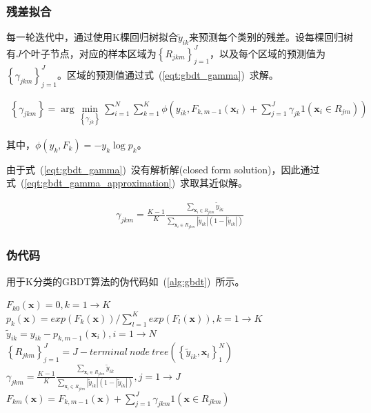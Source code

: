 \documentclass[a4paper,11pt,         %
               ]{article}
\begin{document}
\subsubsection{残差拟合}

每一轮迭代中，通过使用K棵回归树拟合$\tilde{y}_{ik}$来预测每个类别的残差。设每棵回归树有$J$个叶子节点，对应的样本区域为$\left \{ R_{jkm} \right \}_{j=1}^{J}$，以及每个区域的预测值为$\left \{ \gamma _{jkm} \right \}_{j=1}^{J}$。区域的预测值通过式~(\ref{eqt:gbdt_gamma})~求解。

\begin{eqnarray}
  \label{eqt:gbdt_gamma}
\left \{ \gamma _{jkm} \right \} = \arg \min_{\left \{ \gamma _{jk} \right \} } \sum _{i=1}^{N} \sum _{k=1}^{K}\phi \left ( y_{ik},F_{k,m-1}\left ( \mathbf{x}_{i} \right )+\sum _{j=1}^{J} \gamma _{jk}1\left ( \mathbf{x}_{i}\in R_{jm} \right )  \right )
\end{eqnarray}

其中，$\phi \left ( y_{k}, F_{k} \right ) = -y_{k} \log p_{k}$。

由于式~(\ref{eqt:gbdt_gamma})~没有解析解(closed form solution)，因此通过式~(\ref{eqt:gbdt_gamma_approximation})~求取其近似解。

\begin{eqnarray}
  \label{eqt:gbdt_gamma_approximation}
\gamma _{jkm}  = \frac{K - 1}{K} \frac{\sum _{\mathbf{x}_{i} \in R_{jkm}}{\tilde{y}_{ik}}}{\sum _{\mathbf{x}_{i} \in R_{jkm}}{\left | \tilde{y}_{ik} \right |\left ( 1-\left | \tilde{y}_{ik} \right | \right )}}
\end{eqnarray}

\subsubsection{伪代码}

用于K分类的GBDT算法的伪代码如~(\ref{alg:gbdt})~所示。

\begin{algorithm}
  \caption{$L_{K}\_TreeBoost$}
  \label{alg:gbdt}
  \begin{algorithmic}[1] %
  \State $F_{k0}\left ( \mathbf{x} \right ) = 0, k = 1 \to K$
    \State $p_{k}\left ( \mathbf{x} \right ) = exp\left ( F_{k}\left ( \mathbf{x} \right ) \right ) / \sum _{l=1}^{K}{exp\left ( F_{l}\left ( \mathbf{x} \right ) \right )}, k = 1 \to K$
      \State $\tilde{y}_{ik} = y_{ik}-p_{k,m-1}\left ( \mathbf{x}_{i} \right ), i = 1 \to N$
      \State $\left \{ R_{jkm} \right \}_{j=1}^{J} = J-terminal~node~tree\left ( \left \{ \tilde{y}_{ik},\mathbf{x}_{i} \right \}_{1}^{N} \right )$
      \State $\gamma _{jkm}  = \frac{K - 1}{K} \frac{\sum _{\mathbf{x}_{i} \in R_{jkm}}{\tilde{y}_{ik}}}{\sum _{\mathbf{x}_{i} \in R_{jkm}}{\left | \tilde{y}_{ik} \right |\left ( 1-\left | \tilde{y}_{ik} \right | \right )}}, j = 1 \to J$
      \State $F_{km}\left ( \mathbf{x} \right ) = F_{k,m-1}\left ( \mathbf{x} \right ) + \sum _{j=1}^{J}{\gamma_{jkm}1\left ( \mathbf{x} \in R_{jkm}\right ) }$ 
    \EndFor
  \EndFor
  \end{algorithmic}
\end{algorithm}
\end{document}
